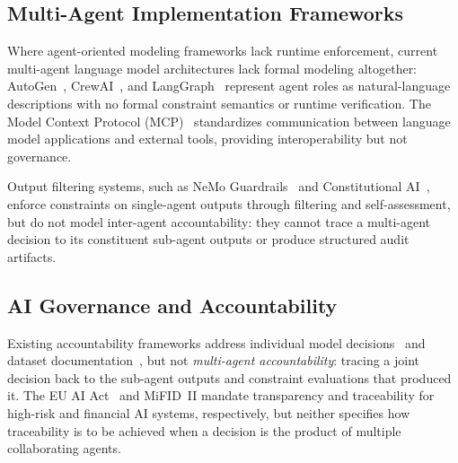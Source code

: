 \documentclass[runningheads]{llncs}
\begin{document}

\subsection{Multi-Agent Implementation Frameworks}
\label{sec:mala}

Where agent-oriented modeling frameworks lack runtime enforcement, current multi-agent language model architectures lack formal modeling altogether:  AutoGen~\cite{wu2023autogen}, CrewAI~\cite{crewai2024}, and
LangGraph~\cite{langgraph2024} represent agent roles as natural-language descriptions with no formal constraint semantics or runtime verification. The Model Context Protocol
(MCP)~\cite{anthropic2024mcp} standardizes communication between language model applications and external tools, providing interoperability but not governance. 

Output filtering systems, such as NeMo Guardrails~\cite{rebedea2023nemo} and Constitutional AI~\cite{bai2022constitutional}, enforce constraints on single-agent outputs through filtering and self-assessment, but do not model inter-agent accountability: they cannot trace a multi-agent decision to its constituent sub-agent outputs or produce
structured audit artifacts. 

\subsection{AI Governance and Accountability}
\label{sec:aigov}

Existing accountability frameworks address individual model decisions~\cite{arrieta2020explainable} and dataset documentation~\cite{gebru2021datasheets,mitchell2019model}, but not \emph{multi-agent accountability}: tracing a joint decision back to the sub-agent outputs and constraint evaluations that produced it. The EU AI Act~\cite{euaiact2024} and MiFID~II mandate transparency and traceability for high-risk and financial AI systems, respectively, but neither specifies how traceability is to be achieved when a decision is the product of multiple
collaborating agents.
\end{document}
